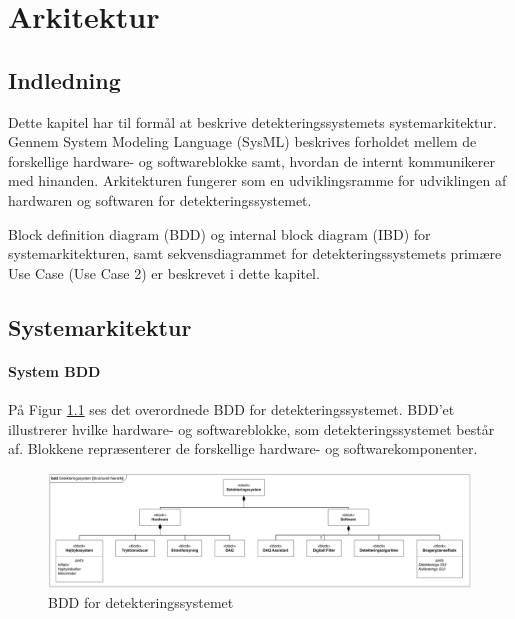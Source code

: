 \chapter{Arkitektur}


\section*{Indledning} 
Dette kapitel har til formål at beskrive detekteringssystemets systemarkitektur. Gennem System Modeling Language (SysML) beskrives forholdet mellem de forskellige hardware- og softwareblokke samt, hvordan de internt kommunikerer med hinanden. Arkitekturen fungerer som en udviklingsramme for udviklingen af hardwaren og softwaren for  detekteringssystemet. 

Block definition diagram (BDD) og internal block diagram (IBD) for systemarkitekturen, samt sekvensdiagrammet for detekteringssystemets primære Use Case (Use Case 2) er beskrevet i dette kapitel. 


\section{Systemarkitektur}
\subsubsection{System BDD}

På Figur \ref{SystemBDD} ses det overordnede BDD for detekteringssystemet. BDD'et illustrerer hvilke hardware- og softwareblokke, som detekteringssystemet består af. Blokkene repræsenterer de forskellige hardware- og softwarekomponenter.   

\begin{figure}[H]
	\centering
	\includegraphics[width=1\textwidth]{Figure/SystemBDD}
	\caption{BDD for detekteringssystemet}
	\label{SystemBDD}
\end{figure}

